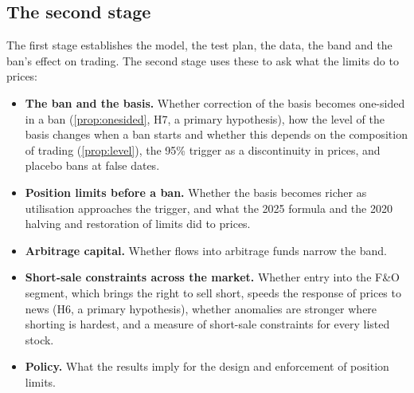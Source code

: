 \subsection{The second stage}
The first stage establishes the model, the test plan, the data, the band and the ban's effect on trading. The second
stage uses these to ask what the limits do to prices:
\begin{itemize}[leftmargin=1.4em,itemsep=2pt]
\item \textbf{The ban and the basis.} Whether correction of the basis becomes one-sided in a ban
(\cref{prop:onesided}, H7, a primary hypothesis), how the level of the basis changes when a ban starts and whether this
depends on the composition of trading (\cref{prop:level}), the 95\% trigger as a discontinuity in prices, and placebo
bans at false dates.
\item \textbf{Position limits before a ban.} Whether the basis becomes richer as utilisation approaches the trigger, and
what the 2025 formula and the 2020 halving and restoration of limits did to prices.
\item \textbf{Arbitrage capital.} Whether flows into arbitrage funds narrow the band.
\item \textbf{Short-sale constraints across the market.} Whether entry into the F\&O segment, which brings the right to sell
short, speeds the response of prices to news (H6, a primary hypothesis), whether anomalies are stronger where shorting
is hardest, and a measure of short-sale constraints for every listed stock.
\item \textbf{Policy.} What the results imply for the design and enforcement of position limits.
\end{itemize}
